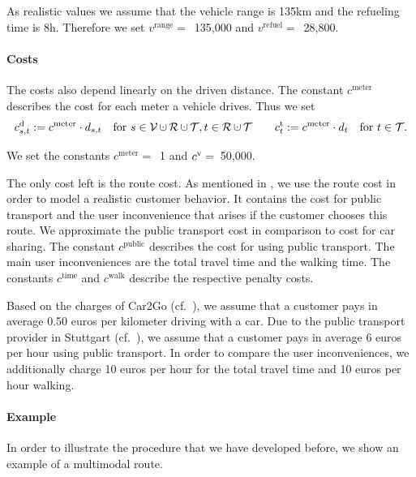 As realistic values we assume that the vehicle range is 135km and the refueling time is 8h. Therefore we set ${v^{\operatorname{range}} =}$~135,000 and ${v^{\operatorname{refuel}} =}$~28,800.

\paragraph{Costs} \parfill

The costs also depend linearly on the driven distance. The constant $c^{\operatorname{meter}}$ describes the cost for each meter a vehicle drives. Thus we set
\begin{align*}
	\cd_{s,t} := c^{\operatorname{meter}}\cdot d_{s,t} && \text{for } s\in\mathcal{V}\cupdot\mathcal{R}\cupdot\mathcal{T}, t\in\mathcal{R}\cupdot\mathcal{T} && && \ct_t := c^{\operatorname{meter}}\cdot d_t && \text{for } t\in\mathcal{T}.
\end{align*}

We set the constants ${c^{\operatorname{meter}} =}$~1 and ${c^{\operatorname{v}} =}$~50,000.

The only cost left is the route cost. As mentioned in , we use the route cost in order to model a realistic customer behavior. It contains the cost for public transport and the user inconvenience that arises if the customer chooses this route. We approximate the public transport cost in comparison to cost for car sharing. The constant $c^{\operatorname{public}}$ describes the cost for using public transport. The main user inconveniences are the total travel time and the walking time. The constants $c^{\operatorname{time}}$ and $c^{\operatorname{walk}}$ describe the respective penalty costs.

Based on the charges of Car2Go (cf.~\cite{Car2Go}), we assume that a customer pays in average 0.50 euros per kilometer driving with a car. Due to the public transport provider in Stuttgart (cf.~\cite{VVS}), we assume that a customer pays in average 6 euros per hour using public transport. In order to compare the user inconveniences, we additionally charge 10 euros per hour for the total travel time and 10 euros per hour walking.

\paragraph{Example} \parfill

In order to illustrate the procedure that we have developed before, we show an example of a multimodal route.

